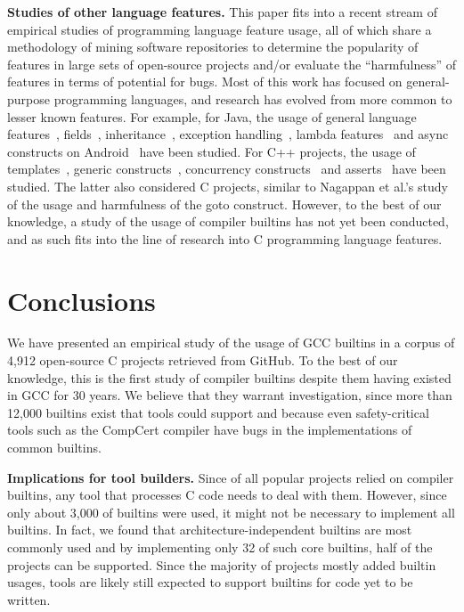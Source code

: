 \documentclass[sigconf,screen]{acmart}
\renewcommand{\paragraph}[1]{\textbf{#1}}
\newcommand\halfprojectnumberbuiltins{32} %
\newcommand\approxnumberusedbuiltins{3,000} %
\begin{document}
\paragraph{Studies of other language features.}
This paper fits into a recent stream of empirical studies of programming language feature usage, all of which share a methodology of mining software repositories to determine the popularity of features in large sets of open-source projects and/or evaluate the ``harmfulness'' of features in terms of potential for bugs. Most of this work has focused on general-purpose programming languages, and research has evolved from more common to lesser known features.
For example, for Java, the usage of general language features~\cite{dyer:javafeatures,qiu:javafeatures}, fields~\cite{ewan:javafields}, inheritance~\cite{Tempero:javainheritance}, exception handling~\cite{Asaduzzaman:javaexceptions,Nakshatri:javaexceptions,Sena:javaexceptions}, lambda features~\cite{Mazinanian:javalambda} and async constructs on Android~\cite{okur:androidasync} have been studied.
For C++ projects, the usage of templates~\cite{wu:cpptemplates}, generic constructs~\cite{sutton:cppgenerics}, concurrency constructs~\cite{wu:concurrencyconstructs} and asserts~\cite{Casalnuovo:asserts} have been studied. The latter also considered C projects, similar to Nagappan et al.'s study~\cite{Nagappan:goto} of the usage and harmfulness of the goto construct.
However, to the best of our knowledge, a study of the usage of compiler builtins has not yet been conducted, and as such fits into the line of research into C programming language features.

\section{Conclusions}
We have presented an empirical study of the usage of GCC builtins in a corpus of 4,912 open-source C projects retrieved from GitHub.
To the best of our knowledge, this is the first study of compiler builtins despite them having existed in GCC for 30 years.
We believe that they warrant investigation, since more than 12,000 builtins exist that tools could support and because even safety-critical tools such as the CompCert compiler have bugs in the implementations of common builtins.

\paragraph{Implications for tool builders.}
Since \percentageProjectsWithBuiltins{} of all popular projects relied on compiler builtins, any tool that processes C code needs to deal with them.
However, since only about \approxnumberusedbuiltins{} of \nrTotalTerms{} builtins were used, it might not be necessary to implement all builtins.
In fact, we found that architecture-independent builtins are most commonly used and by implementing only \halfprojectnumberbuiltins{} of such core builtins, half of the projects can be supported.
Since the majority of projects mostly added builtin usages, tools are likely still expected to support builtins for code yet to be written.
\end{document}
